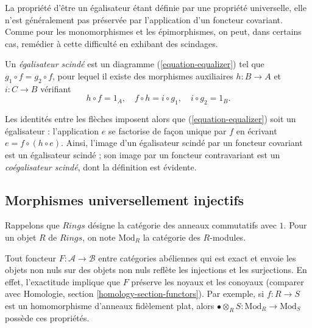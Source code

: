 \medskip\noindent
La propriété d'être un égalisateur étant définie par une propriété universelle,
elle n'est généralement pas préservée par l'application d'un foncteur covariant.
Comme pour les monomorphismes et les épimorphismes, on peut, dans certains cas,
remédier à cette difficulté en exhibant des scindages.

\begin{definition}
\label{definition-split-equalizer}
Un {\it égalisateur scindé} est un diagramme (\ref{equation-equalizer})
tel que $g_1 \circ f = g_2 \circ f$, pour lequel il existe des morphismes auxiliaires
$h : B \to A$ et $i : C \to B$ vérifiant
\begin{equation}
\label{equation-split-equalizer-conditions}
h \circ f = 1_A, \quad f \circ h = i \circ g_1, \quad i \circ g_2 = 1_B.
\end{equation}
\end{definition}

\noindent
Les identités entre les flèches imposent alors que (\ref{equation-equalizer})
soit un égalisateur : l'application $e$ se factorise de façon unique par $f$
en écrivant $e = f \circ (h \circ e)$.
Ainsi, l'image d'un égalisateur scindé par un foncteur covariant
est un égalisateur scindé ; son image par un foncteur contravariant
est un {\it coégalisateur scindé}, dont la définition est évidente.

\subsection{Morphismes universellement injectifs}
\label{subsection-universally-injective}

\noindent
Rappelons que $\textit{Rings}$ désigne la catégorie des anneaux commutatifs
avec $1$. Pour un objet $R$ de $\textit{Rings}$, on note $\text{Mod}_R$
la catégorie des $R$-modules.

\begin{remark}
\label{remark-reflects}
Tout foncteur $F : \mathcal{A} \to \mathcal{B}$ entre catégories abéliennes
qui est exact et envoie les objets non nuls sur des objets non nuls
reflète les injections et les surjections. En effet, l'exactitude implique
que $F$ préserve les noyaux et les conoyaux (comparer avec
Homologie, section \ref{homology-section-functors}).
Par exemple, si $f : R \to S$ est un homomorphisme d'anneaux fidèlement plat,
alors $\bullet \otimes_R S: \text{Mod}_R \to \text{Mod}_S$ possède ces propriétés.
\end{remark}

